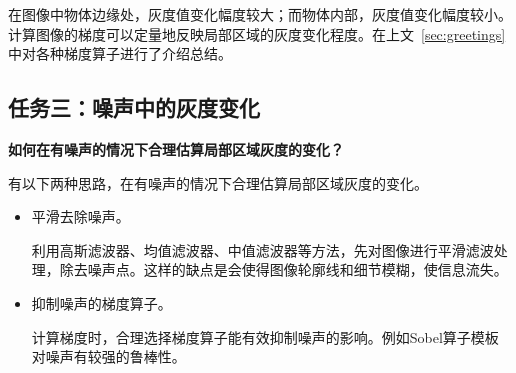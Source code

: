 \documentclass[10pt,twocolumn,letterpaper]{article}
\begin{document}
在图像中物体边缘处，灰度值变化幅度较大；而物体内部，灰度值变化幅度较小。计算图像的梯度可以定量地反映局部区域的灰度变化程度。在上文~\ref{sec:greetings} 中对各种梯度算子进行了介绍总结。

\subsection{任务三：噪声中的灰度变化}
\textbf{如何在有噪声的情况下合理估算局部区域灰度的变化？}

有以下两种思路，在有噪声的情况下合理估算局部区域灰度的变化。
\begin{itemize}
   \item 平滑去除噪声。
   
   利用高斯滤波器、均值滤波器、中值滤波器等方法，先对图像进行平滑滤波处理，除去噪声点。这样的缺点是会使得图像轮廓线和细节模糊，使信息流失。

   \item 抑制噪声的梯度算子。
   
   计算梯度时，合理选择梯度算子能有效抑制噪声的影响。例如Sobel算子模板对噪声有较强的鲁棒性。
\end{itemize}

%
%
\end{document}
